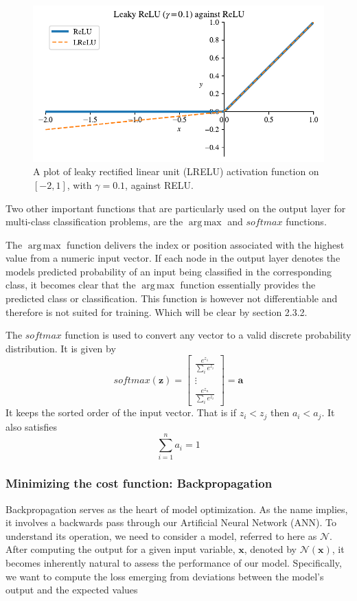 \documentclass{article}
\theoremstyle{definition}
\DeclareMathOperator*{\argmax}{arg\,max}
\begin{document}
\begin{figure}[ht]
    \centering
    \includegraphics[width=.7\textwidth]{activators/LReLU.pdf}
    \caption{A plot of leaky rectified linear unit (LRELU) activation function on $[-2, 1]$, with $\gamma=0.1$, against RELU.}
    \label{fig:LRELU}
\end{figure}


Two other important functions that are particularly used on the output layer for multi-class classification problems, are the $\argmax$ and $softmax$ functions.

The $\argmax$ function delivers the index or position associated with the highest value from a numeric input vector. If  each node in the output layer denotes the models predicted probability of an input being classified in the corresponding class, it becomes clear that the $\argmax$ function essentially provides the predicted class or classification. This function is however not differentiable and therefore is not suited for training. Which will be clear by section 2.3.2.

The $softmax$ function is used to convert any vector to a valid discrete probability distribution. It is given by
\[
softmax(\textbf{z}) = \begin{bmatrix}
\frac{e^{z_1}}{\sum_i e^{z_i}} \\
\vdots \\
\frac{e^{z_n}}{\sum_i e^{z_i}}
\end{bmatrix} = \textbf{a}
\]
It keeps the sorted order of the input vector. That is if $z_i < z_j$ then $a_i < a_j$. It also satisfies
\[
\sum_{i=1}^n a_i = 1
\]



\subsubsection{Minimizing the cost function: Backpropagation}

Backpropagation serves as the heart of model optimization. As the name implies, it involves a backwards pass through our Artificial Neural Network (ANN). To understand its operation, we need to consider a model, referred to here as $\mathcal{N}$. After computing the output for a given input variable, $\boldsymbol{x}$, denoted by $\mathcal{N}(\boldsymbol{x})$, it becomes inherently natural to assess the performance of our model. Specifically, we want to compute the loss emerging from deviations between the model's output and the expected values
\end{document}
